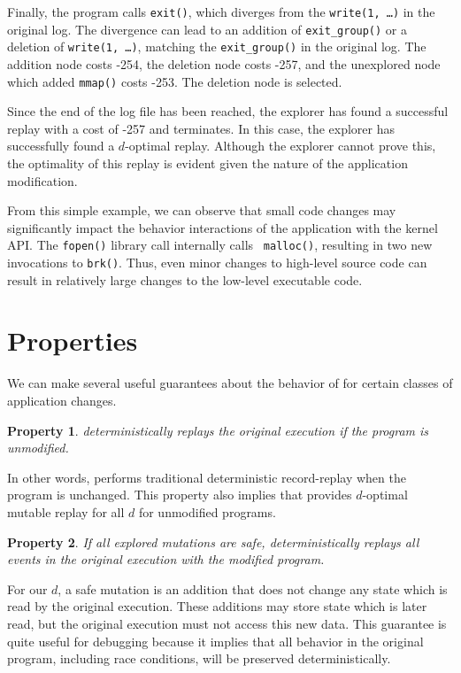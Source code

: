 Finally, the program calls {\tt exit()}, which diverges
from the {\tt write(1, \ldots)} in the original log. The
divergence can lead to an addition of {\tt exit\_group()}
or a deletion of {\tt write(1, \ldots)}, matching the
{\tt exit\_group()} in the original log.
The addition node costs -254, the deletion node costs -257, and the unexplored node
which added {\tt mmap()} costs -253. The deletion node is selected.

Since the end of the log file has been reached, the explorer has found a
successful replay with a cost of -257 and terminates. In this case, the explorer
has successfully found a $d$-optimal replay. Although the explorer cannot prove
this, the optimality of this replay is evident given the nature of the
application modification.

From this simple example, we can observe that small code
changes may significantly impact the behavior interactions of the application
with the kernel API.  The {\tt fopen()} library call internally calls {\tt
malloc()}, resulting in two new invocations to {\tt brk()}. Thus, even minor
changes to high-level source code can result in relatively large changes to the
low-level executable code.

\section{Properties}
\label{dora:sec:properties}

We can make several useful guarantees about the behavior of {\dora}
for certain classes of application changes.

\newtheorem{property}{Property}

\begin{property}
	{\dora} deterministically replays the original execution
        if the program is unmodified.
\end{property}
        In other words, {\dora} performs traditional
        deterministic record-replay when the program is unchanged.
        This property also implies that {\dora} provides
        $d$-optimal mutable replay for all $d$ for unmodified programs.

\begin{property}
	If all explored mutations are \emph{safe}, {\dora}
        deterministically replays all events in the original execution
        with the modified program. 
\end{property}
	For our $d$, a safe mutation is an addition that does not change
	any state which is read by the original execution. These additions may store
	state which is later read, but the original execution must not access this
	new data. This guarantee is quite useful for
	debugging because it implies that all behavior in the original program,
	including race conditions, will be preserved deterministically.

